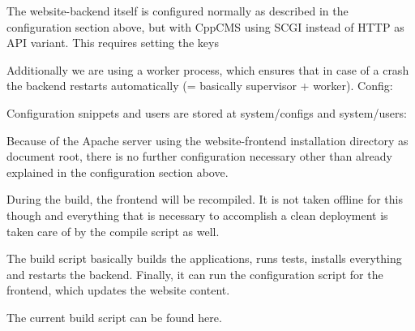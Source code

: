 The {\ttfamily website-\/backend} itself is configured normally as described in the configuration section above, but with Cpp\+C\+MS using S\+C\+GI instead of H\+T\+TP as A\+PI variant. This requires setting the keys


\begin{DoxyCode}{0}
\end{DoxyCode}


Additionally we are using a worker process, which ensures that in case of a crash the backend restarts automatically (= basically supervisor + worker). Config\+:


\begin{DoxyCode}{0}
\end{DoxyCode}


Configuration snippets and users are stored at {\ttfamily system/configs} and {\ttfamily system/users}\+:


\begin{DoxyCode}{0}
\end{DoxyCode}


Because of the Apache server using the website-\/frontend installation directory as document root, there is no further configuration necessary other than already explained in the configuration section above.

During the build, the frontend will be recompiled. It is not taken offline for this though and everything that is necessary to accomplish a clean deployment is taken care of by the compile script as well.

The build script basically builds the applications, runs tests, installs everything and restarts the backend. Finally, it can run the configuration script for the frontend, which updates the website content.

The current build script can be found here. 